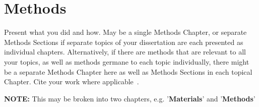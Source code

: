\chapter{Methods}\label{chap:methods}

Present what you did and how. May be a single Methods Chapter, or separate Methods Sections if separate topics of your dissertation are each presented as individual chapters. Alternatively, if there are methods that are relevant to all your topics, as well as methods germane to each topic individually, there might be a separate Methods Chapter here as well as Methods Sections in each topical Chapter. Cite your work where applicable~\cite{AuthorYear}.

\textbf{NOTE:} This may be broken into two chapters, e.g. '\textbf{Materials}' and '\textbf{Methods}'
\endinput
